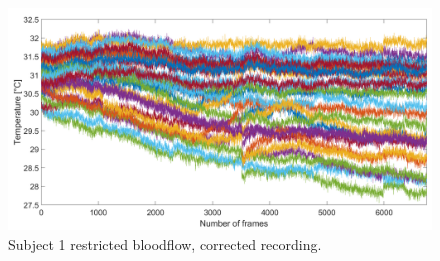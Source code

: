 \begin{figure}[htbp]
\begin{minipage}[b]{0.45\linewidth}
	\end{minipage}
	\hspace{0.2cm}
	\begin{minipage}[b]{0.45\linewidth}
		\centering
		\includegraphics[width=\linewidth]{figures/Recordings/Sub2_cuffed_corr}
		\caption{Subject 1 restricted bloodflow, corrected recording.}
		
	\end{minipage}
\end{figure}


